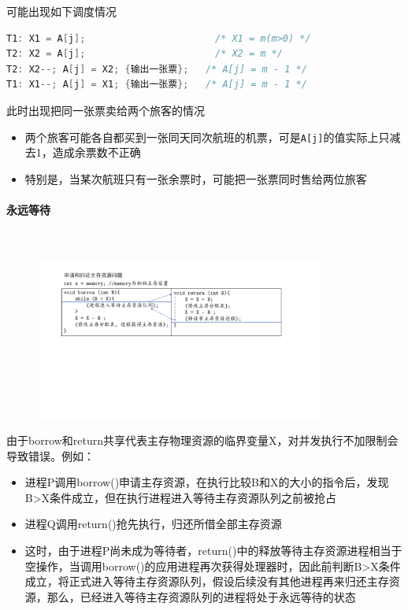 \documentclass[cs4size,a4paper,10pt]{ctexart}
\begin{document}
	可能出现如下调度情况
	\begin{lstlisting}[language=C,keywordstyle=\color{black}]
T1: X1 = A[j];                       /* X1 = m(m>0) */
T2: X2 = A[j];                       /* X2 = m */
T2: X2--; A[j] = X2; {输出一张票};   /* A[j] = m - 1 */
T1: X1--; A[j] = X1; {输出一张票};   /* A[j] = m - 1 */
	\end{lstlisting}

	此时出现把同一张票卖给两个旅客的情况
	\begin{itemize}
		\item 两个旅客可能各自都买到一张同天同次航班的机票，可是\verb|A[j]|的值实际上只减去1，造成余票数不正确
		\item 特别是，当某次航班只有一张余票时，可能把一张票同时售给两位旅客
	\end{itemize}


	\paragraph{永远等待}~{}

	\begin{figure}[H]
		\centering
		\includegraphics[width=0.85\textwidth]{img/申请和归还主存资源问题.pdf}
	\end{figure}

	由于borrow和return共享代表主存物理资源的临界变量X，对并发执行不加限制会导致错误。例如：
	\begin{itemize}
		\item 进程P调用borrow()申请主存资源，在执行比较B和X的大小的指令后，发现B>X条件成立，但在执行{进程进入等待主存资源队列}之前被抢占
		\item 进程Q调用return()抢先执行，归还所借全部主存资源
		\item 这时，由于进程P尚未成为等待者，return()中的{释放等待主存资源进程}相当于空操作，当调用borrow()的应用进程再次获得处理器时，因此前判断B>X条件成立，将正式进入等待主存资源队列，假设后续没有其他进程再来归还主存资源，那么，已经进入等待主存资源队列的进程将处于永远等待的状态
	\end{itemize}
	
\end{document}
